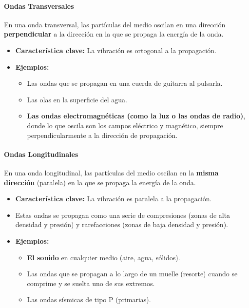 \paragraph{Ondas Transversales}
En una onda transversal, las partículas del medio oscilan en una dirección \textbf{perpendicular} a la dirección en la que se propaga la energía de la onda.
\begin{itemize}
    \item \textbf{Característica clave:} La vibración es ortogonal a la propagación.
    \item \textbf{Ejemplos:}
    \begin{itemize}
        \item Las ondas que se propagan en una cuerda de guitarra al pulsarla.
        \item Las olas en la superficie del agua.
        \item \textbf{Las ondas electromagnéticas (como la luz o las ondas de radio)}, donde lo que oscila son los campos eléctrico y magnético, siempre perpendicularmente a la dirección de propagación.
    \end{itemize}
\end{itemize}

\paragraph{Ondas Longitudinales}
En una onda longitudinal, las partículas del medio oscilan en la \textbf{misma dirección} (paralela) en la que se propaga la energía de la onda.
\begin{itemize}
    \item \textbf{Característica clave:} La vibración es paralela a la propagación.
    \item Estas ondas se propagan como una serie de compresiones (zonas de alta densidad y presión) y rarefacciones (zonas de baja densidad y presión).
    \item \textbf{Ejemplos:}
    \begin{itemize}
        \item \textbf{El sonido} en cualquier medio (aire, agua, sólidos).
        \item Las ondas que se propagan a lo largo de un muelle (resorte) cuando se comprime y se suelta uno de sus extremos.
        \item Las ondas sísmicas de tipo P (primarias).
    \end{itemize}
\end{itemize}

